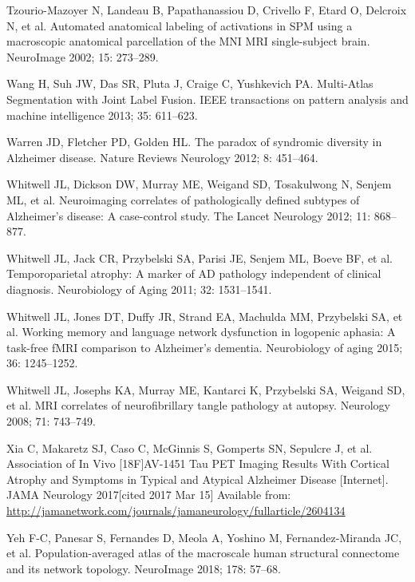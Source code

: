 \documentclass[]{article}
\begin{document}
\hypertarget{ref-tzourio-mazoyer_automated_2002}{}
Tzourio-Mazoyer N, Landeau B, Papathanassiou D, Crivello F, Etard O,
Delcroix N, et al. Automated anatomical labeling of activations in SPM
using a macroscopic anatomical parcellation of the MNI MRI
single-subject brain. NeuroImage 2002; 15: 273--289.

\hypertarget{ref-wang_multi-atlas_2013}{}
Wang H, Suh JW, Das SR, Pluta J, Craige C, Yushkevich PA. Multi-Atlas
Segmentation with Joint Label Fusion. IEEE transactions on pattern
analysis and machine intelligence 2013; 35: 611--623.

\hypertarget{ref-warren_paradox_2012}{}
Warren JD, Fletcher PD, Golden HL. The paradox of syndromic diversity in
Alzheimer disease. Nature Reviews Neurology 2012; 8: 451--464.

\hypertarget{ref-whitwell_neuroimaging_2012}{}
Whitwell JL, Dickson DW, Murray ME, Weigand SD, Tosakulwong N, Senjem
ML, et al. Neuroimaging correlates of pathologically defined subtypes of
Alzheimer's disease: A case-control study. The Lancet Neurology 2012;
11: 868--877.

\hypertarget{ref-whitwell_temporoparietal_2011}{}
Whitwell JL, Jack CR, Przybelski SA, Parisi JE, Senjem ML, Boeve BF, et
al. Temporoparietal atrophy: A marker of AD pathology independent of
clinical diagnosis. Neurobiology of Aging 2011; 32: 1531--1541.

\hypertarget{ref-whitwell_working_2015}{}
Whitwell JL, Jones DT, Duffy JR, Strand EA, Machulda MM, Przybelski SA,
et al. Working memory and language network dysfunction in logopenic
aphasia: A task-free fMRI comparison to Alzheimer's dementia.
Neurobiology of aging 2015; 36: 1245--1252.

\hypertarget{ref-whitwell_mri_2008}{}
Whitwell JL, Josephs KA, Murray ME, Kantarci K, Przybelski SA, Weigand
SD, et al. MRI correlates of neurofibrillary tangle pathology at
autopsy. Neurology 2008; 71: 743--749.

\hypertarget{ref-xia_association_2017}{}
Xia C, Makaretz SJ, Caso C, McGinnis S, Gomperts SN, Sepulcre J, et al.
Association of In Vivo {[}18F{]}AV-1451 Tau PET Imaging Results With
Cortical Atrophy and Symptoms in Typical and Atypical Alzheimer Disease
{[}Internet{]}. JAMA Neurology 2017{[}cited 2017 Mar 15{]} Available
from:
\url{http://jamanetwork.com/journals/jamaneurology/fullarticle/2604134}

\hypertarget{ref-yeh_population-averaged_2018}{}
Yeh F-C, Panesar S, Fernandes D, Meola A, Yoshino M, Fernandez-Miranda
JC, et al. Population-averaged atlas of the macroscale human structural
connectome and its network topology. NeuroImage 2018; 178: 57--68.
\end{document}
